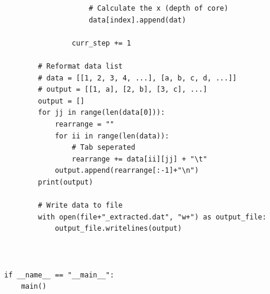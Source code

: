 \documentclass[10pt,a4paper]{article}
\begin{document}
\begin{flushleft}
\begin{verbatim}
                    # Calculate the x (depth of core)
                    data[index].append(dat)

                curr_step += 1

        # Reformat data list
        # data = [[1, 2, 3, 4, ...], [a, b, c, d, ...]]
        # output = [[1, a], [2, b], [3, c], ...]
        output = []
        for jj in range(len(data[0])):
            rearrange = ""
            for ii in range(len(data)):
                # Tab seperated
                rearrange += data[ii][jj] + "\t"
            output.append(rearrange[:-1]+"\n")
        print(output)

        # Write data to file        
        with open(file+"_extracted.dat", "w+") as output_file:
            output_file.writelines(output)
        


if __name__ == "__main__":
    main()
\end{verbatim}
\normalsize
\end{flushleft}
\end{document}
